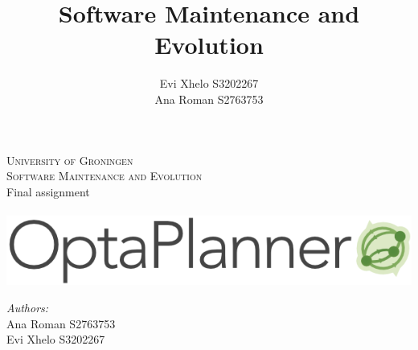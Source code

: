 \documentclass{article}
\title{Software Maintenance and Evolution}
\author{
    Evi Xhelo S3202267 \\
    Ana Roman S2763753 
        }
\begin{document}
\begin{titlepage}
\newcommand{\HRule}{\rule{\linewidth}{0.5mm}}
\center
\textsc{\Large University of Groningen \\
Software Maintenance and Evolution}\\[0.3cm]
{\large Final assignment}\\[1.5cm]
~
\centering
\includegraphics[scale=0.5]{figures/logo.png}\\[4cm]
\begin{minipage}{0.4\textwidth}
\centering
\emph{Authors:}\\
Ana Roman S2763753\\
Evi Xhelo S3202267
\end{minipage}\\[1.5cm]
\vfill
\end{titlepage}
\maketitle












\clearpage


\clearpage


\end{document}
